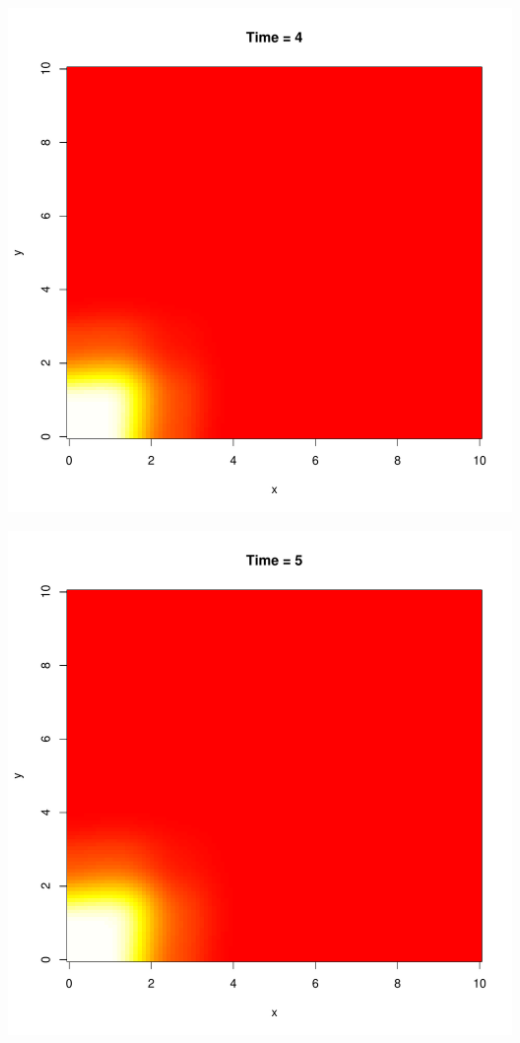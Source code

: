 \documentclass{tufte-handout}\usepackage[]{graphicx}\usepackage[]{xcolor}
\makeatletter
\def\maxwidth{ %
  \ifdim\Gin@nat@width>\linewidth
    \linewidth
  \else
    \Gin@nat@width
  \fi
}
\newenvironment{knitrout}{}{} %
\makeatother
\begin{document}
\begin{knitrout}
\includegraphics[width=\maxwidth]{figure/unnamed-chunk-4-5} 

\includegraphics[width=\maxwidth]{figure/unnamed-chunk-4-6} 


\end{knitrout}
\end{document}
